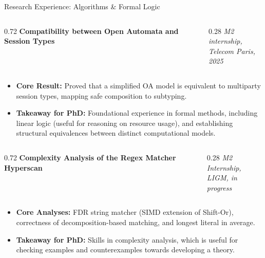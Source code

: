 \documentclass[xcolor=dvipsnames, aspectratio=169, 10pt]{beamer}
\begin{document}
\begin{frame}{Research Experience: Algorithms \& Formal Logic}
  \begin{columns}[t]
    \begin{column}{0.72\textwidth}
      \textbf{Compatibility between Open Automata and Session Types}
    \end{column}
    \begin{column}{0.28\textwidth}
      \raggedleft\textit{M2 internship, \\ Telecom Paris, 2025}
    \end{column}
  \end{columns}
  \vspace{-0.5em}
  \begin{itemize}
    \item \textbf{Core Result:} Proved that a simplified OA model is equivalent to multiparty session types, mapping safe composition to subtyping.
    \item \textbf{Takeaway for PhD:} Foundational experience in formal methods, including linear logic (useful for reasoning on resource usage), and establishing structural equivalences between distinct computational models.
  \end{itemize}


  \vspace{0.8em}
  \begin{columns}[t]
    \begin{column}{0.72\textwidth}
      \textbf{Complexity Analysis of the Regex Matcher Hyperscan}
    \end{column}
    \begin{column}{0.28\textwidth}
      \raggedleft\textit{M2 Internship, \\ LIGM, in progress}
    \end{column}
  \end{columns}

  \begin{itemize}
    \item \textbf{Core Analyses:} FDR string matcher (SIMD extension of Shift-Or), correctness of decomposition-based matching, and longest literal in average.
    \item \textbf{Takeaway for PhD:} Skills in complexity analysis, which is useful for checking examples and counterexamples towards developing a theory.
  \end{itemize}



\end{frame}
\end{document}
